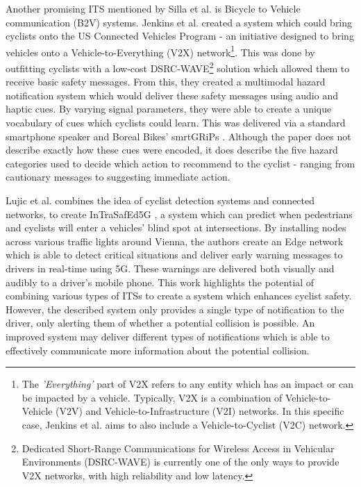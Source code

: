 \documentclass{interim}
\begin{document}
Another promising ITS mentioned by Silla et al. \cite{SILLA2017134} is Bicycle to Vehicle communication (B2V) systems. Jenkins et al. created a system which could bring cyclists onto the US Connected Vehicles Program \cite{usdot} - an initiative designed to bring vehicles onto a Vehicle-to-Everything (V2X) network\footnote{The \textit{'Everything'} part of V2X refers to any entity which has an impact or can be impacted by a vehicle. Typically, V2X is a combination of Vehicle-to-Vehicle (V2V) and Vehicle-to-Infrastructure (V2I) networks. In this specific case, Jenkins et al. aims to also include a Vehicle-to-Cyclist (V2C) network.}. This was done by outfitting cyclists with a low-cost DSRC-WAVE\footnote{Dedicated Short-Range Communications for Wireless Access in Vehicular Environments (DSRC-WAVE) is currently one of the only ways to provide V2X networks, with high reliability and low latency.} solution which allowed them to receive basic safety messages. From this, they created a multimodal hazard notification system which would deliver these safety messages using audio and haptic cues. By varying signal parameters, they were able to create a unique vocabulary of cues which cyclists could learn. This was delivered via a standard smartphone speaker and Boreal Bikes’ smrtGRiPs \cite{smartgrips}. Although the paper does not describe exactly how these cues were encoded, it does describe the five hazard categories used to decide which action to recommend to the cyclist - ranging from cautionary messages to suggesting immediate action.

Lujic et al. combines the idea of cyclist detection systems and connected networks, to create InTraSafEd5G \cite{10.1145/3434770.3459732}, a system which can predict when pedestrians and cyclists will enter a vehicles' blind spot at intersections. By installing nodes across various traffic lights around Vienna, the authors create an Edge network which is able to detect critical situations and deliver early warning messages to drivers in real-time using 5G. These warnings are delivered both visually and audibly to a driver’s mobile phone. This work highlights the potential of combining various types of ITSs to create a system which enhances cyclist safety. However, the described system only provides a single type of notification to the driver, only alerting them of whether a potential collision is possible. An improved system may deliver different types of notifications which is able to effectively communicate more information about the potential collision.
\end{document}
